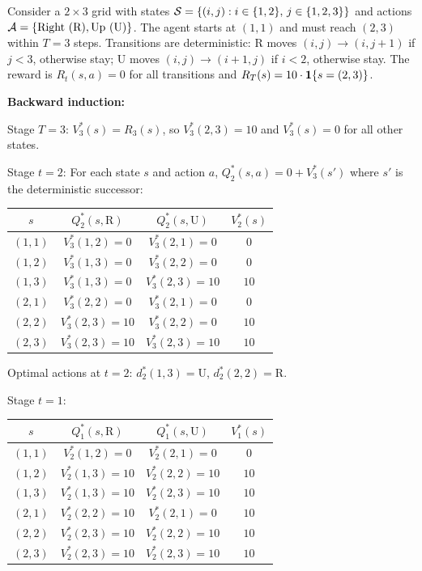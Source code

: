 \documentclass[11pt,a4paper]{article}
\begin{document}
\begin{example}
\label{ex:shortest-path}
Consider a $2 \times 3$ grid with states
$\mathcal{S} = \{(i,j) : i \in \{1,2\},\, j \in \{1,2,3\}\}$ and
actions $\mathcal{A} = \{\text{Right (R)}, \text{Up (U)}\}$. The agent
starts at $(1,1)$ and must reach $(2,3)$ within $T = 3$ steps.
Transitions are deterministic: R moves $(i,j) \to (i, j+1)$ if
$j < 3$, otherwise stay; U moves $(i,j) \to (i+1, j)$ if $i < 2$,
otherwise stay. The reward is $R_t(s,a) = 0$ for all transitions and
$R_T(s) = 10 \cdot \mathbf{1}\{s = (2,3)\}$.

\textbf{Backward induction:}

Stage $T = 3$: $V_3^*(s) = R_3(s)$, so $V_3^*(2,3) = 10$ and
$V_3^*(s) = 0$ for all other states.

Stage $t = 2$: For each state $s$ and action $a$,
$Q_2^*(s,a) = 0 + V_3^*(s')$ where $s'$ is the deterministic
successor:
\begin{center}
\begin{tabular}{cccc}
\toprule
$s$ & $Q_2^*(s, \text{R})$ & $Q_2^*(s, \text{U})$ & $V_2^*(s)$ \\
\midrule
$(1,1)$ & $V_3^*(1,2) = 0$ & $V_3^*(2,1) = 0$ & $0$ \\
$(1,2)$ & $V_3^*(1,3) = 0$ & $V_3^*(2,2) = 0$ & $0$ \\
$(1,3)$ & $V_3^*(1,3) = 0$ & $V_3^*(2,3) = 10$ & $10$ \\
$(2,1)$ & $V_3^*(2,2) = 0$ & $V_3^*(2,1) = 0$ & $0$ \\
$(2,2)$ & $V_3^*(2,3) = 10$ & $V_3^*(2,2) = 0$ & $10$ \\
$(2,3)$ & $V_3^*(2,3) = 10$ & $V_3^*(2,3) = 10$ & $10$ \\
\bottomrule
\end{tabular}
\end{center}
Optimal actions at $t = 2$: $d_2^*(1,3) = \text{U}$,
$d_2^*(2,2) = \text{R}$.

Stage $t = 1$:
\begin{center}
\begin{tabular}{cccc}
\toprule
$s$ & $Q_1^*(s, \text{R})$ & $Q_1^*(s, \text{U})$ & $V_1^*(s)$ \\
\midrule
$(1,1)$ & $V_2^*(1,2) = 0$ & $V_2^*(2,1) = 0$ & $0$ \\
$(1,2)$ & $V_2^*(1,3) = 10$ & $V_2^*(2,2) = 10$ & $10$ \\
$(1,3)$ & $V_2^*(1,3) = 10$ & $V_2^*(2,3) = 10$ & $10$ \\
$(2,1)$ & $V_2^*(2,2) = 10$ & $V_2^*(2,1) = 0$ & $10$ \\
$(2,2)$ & $V_2^*(2,3) = 10$ & $V_2^*(2,2) = 10$ & $10$ \\
$(2,3)$ & $V_2^*(2,3) = 10$ & $V_2^*(2,3) = 10$ & $10$ \\
\bottomrule
\end{tabular}
\end{center}


\end{example}
\end{document}
